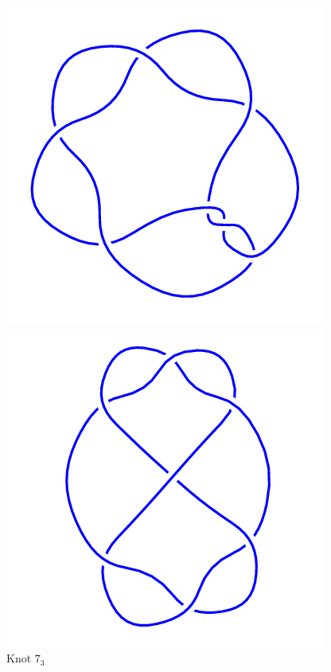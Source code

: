 \documentclass{article}
\begin{document}
\begin{figure}[!htb]
\includegraphics[width=\linewidth]{7_3.png}
\caption{Knot $7_3$}
\endminipage\hfill
{}
\includegraphics[width=\linewidth]{7_4.png}

\end{figure}
\end{document}
